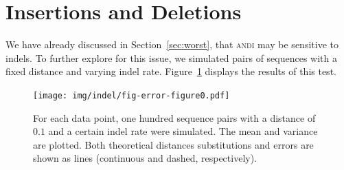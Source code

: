 \documentclass[a4paper,
  10pt,
  english,
  DIV=12,
  BCOR=8mm]{scrbook}
\newcommand{\algo}[1]{\textsc{{#1}}}
\newcommand{\andi}{\algo{andi} }
\begin{document}






\section{Insertions and Deletions} \label{sec:indels}

We have already discussed in Section~\ref{sec:worst}, that \andi may be sensitive to indels. To further explore for this issue, we simulated pairs of sequences with a fixed distance and varying indel rate. Figure~\ref{fig:indel} displays the results of this test.

\begin{figure}
  \centering
  \texttt{[image: img/indel/fig-error-figure0.pdf]}
  \caption[Indel Characteristics]{\label{fig:indel} For each data point, one hundred sequence pairs with a distance of $0.1$ and a certain indel rate were simulated. The mean and variance are plotted. Both theoretical distances substitutions and errors are shown as lines (continuous and dashed, respectively).}
\end{figure}
\end{document}
